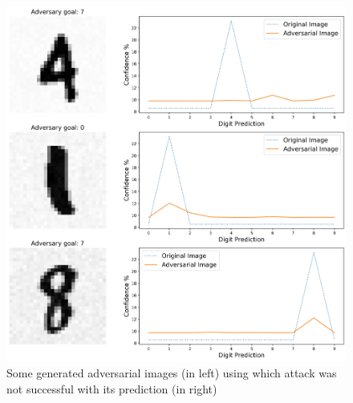         \begin{figure}[!h]
            \centering
            \includegraphics[width=\linewidth]{images/generated_adversarial_images_unsuccessful.jpg}
            \caption{Some generated adversarial images (in left) using which attack was not successful with its prediction (in right)}
            \label{fig:adversarial_images_unsuccessful}
        \end{figure}

    